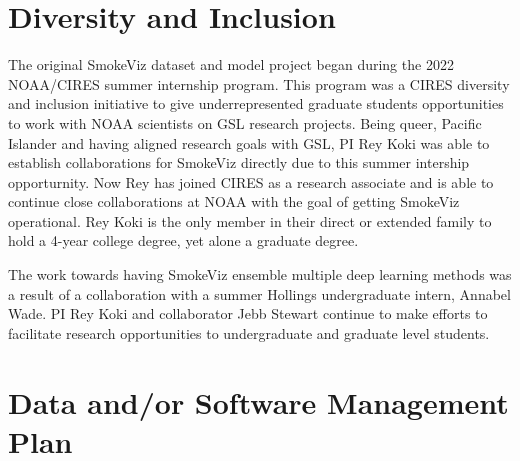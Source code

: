 \section{Diversity and Inclusion}

The original SmokeViz dataset and model project began during the 2022 NOAA/CIRES summer internship program. This program was a CIRES diversity and inclusion initiative to give underrepresented graduate students opportunities to work with NOAA scientists on GSL research projects. Being queer, Pacific Islander and having aligned research goals with GSL, PI Rey Koki was able to establish collaborations for SmokeViz directly due to this summer intership opporturnity. Now Rey has joined CIRES as a research associate and is able to continue close collaborations at NOAA with the goal of getting SmokeViz operational. Rey Koki is the only member in their direct or extended family to hold a 4-year college degree, yet alone a graduate degree. 

The work towards having SmokeViz ensemble multiple deep learning methods was a result of a collaboration with a summer Hollings undergraduate intern, Annabel Wade. PI Rey Koki and collaborator Jebb Stewart continue to make efforts to facilitate research opportunities to undergraduate and graduate level students.

\section{Data and/or Software Management Plan}


